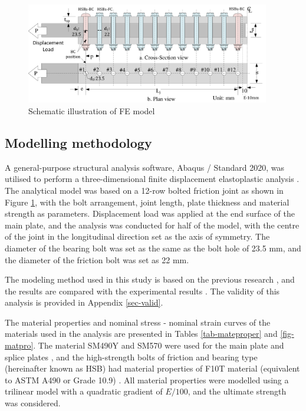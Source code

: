 \begin{figure}[htbp]
    \centering
    \includegraphics[width=0.95\textwidth]{imgs/ch7/femodelsize.pdf}
    \caption{Schematic illustration of FE model}
    \label{fig8-modelsize}
\end{figure}

\subsection{Modelling methodology}

A general-purpose structural analysis software, Abaqus / Standard 2020, was utilised to perform a three-dimensional finite displacement elastoplastic analysis \cite{Smith2020}. The analytical model was based on a 12-row bolted friction joint as shown in Figure \ref{fig8-modelsize}, with the bolt arrangement, joint length, plate thickness and material strength as parameters. Displacement load was applied at the end surface of the main plate, and the analysis was conducted for half of the model, with the centre of the joint in the longitudinal direction set as the axis of symmetry. The diameter of the bearing bolt was set as the same as the bolt hole of 23.5 mm, and the diameter of the friction bolt was set as 22 mm.

The modeling method used in this study is based on the previous research \cite{Chen2023MechanicalConnections}, and the results are compared with the experimental results \cite{chen_experimental_2024}. The validity of this analysis is provided in Appendix \ref{sec-valid}.

The material properties and nominal stress - nominal strain curves of the materials used in the analysis are presented in Tables \ref{tab-mateproper} and \ref{fig-matpro}. The material SM490Y and SM570 were used for the main plate and splice plates \cite{JISsteel}, and the high-strength bolts of friction and bearing type (hereinafter known as HSB) had material properties of F10T material \cite{JISbolt} (equivalent to ASTM A490 or Grade 10.9) \cite{ASTM-bolt,ISO-bolt}. All material properties were modelled using a trilinear model with a quadratic gradient of $E/100$, and the ultimate strength was considered.


